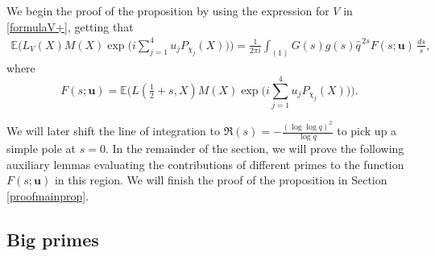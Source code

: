 \documentclass[12pt, reqno]{amsart}
\newcommand{\E}{\mathbb{E}}
\numberwithin{equation}{section}
\numberwithin{theorem}{section}
\numberwithin{equation}{section}
\begin{document}
   We begin the proof of the proposition by using the expression for $V$ in \eqref{formulaV+}, getting that 
    \begin{align}
    \label{mellin}
        \E\Bigg( L_V(X) M(X) \exp\bigg(  i\sum_{j=1}^4 u_jP_{\chi_j}(X)\bigg)\Bigg)  = \frac{1}{2 \pi i} \int_{(1)} G(s)g(s) \widehat{q}^{\,2s} F(s;\textbf{u}) \, \frac{ds}{s},
    \end{align}
    where
    $$F(s;\textbf{u}) = \E \Bigg(L(\tfrac12+s,X)M(X) \exp\bigg(  i\sum_{j=1}^4 u_jP_{\chi_j}(X)\bigg) \Bigg).$$
    
    We will later shift the line of integration to $\Re(s)=-\frac{(\log \log q)^2}{\log q}$ to pick up a simple pole at $s=0$. In the remainder of the section, we will prove the following auxiliary lemmas evaluating the contributions of different primes to the function $F(s;\textbf{u})$ in this region. We will finish the proof of the proposition in Section \ref{proofmainprop}.
    
    \subsection{Big primes}
\end{document}
